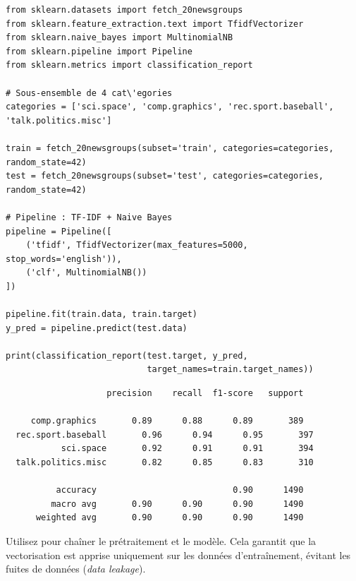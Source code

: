 \begin{codeblock}[title=\textbf{Python}]
\begin{verbatim}
from sklearn.datasets import fetch_20newsgroups
from sklearn.feature_extraction.text import TfidfVectorizer
from sklearn.naive_bayes import MultinomialNB
from sklearn.pipeline import Pipeline
from sklearn.metrics import classification_report

# Sous-ensemble de 4 cat\'egories
categories = ['sci.space', 'comp.graphics', 'rec.sport.baseball', 'talk.politics.misc']

train = fetch_20newsgroups(subset='train', categories=categories, random_state=42)
test = fetch_20newsgroups(subset='test', categories=categories, random_state=42)

# Pipeline : TF-IDF + Naive Bayes
pipeline = Pipeline([
    ('tfidf', TfidfVectorizer(max_features=5000, stop_words='english')),
    ('clf', MultinomialNB())
])

pipeline.fit(train.data, train.target)
y_pred = pipeline.predict(test.data)

print(classification_report(test.target, y_pred,
                            target_names=train.target_names))
\end{verbatim}
\end{codeblock}

\begin{codeoutput}
\begin{verbatim}
                    precision    recall  f1-score   support

     comp.graphics       0.89      0.88      0.89       389
  rec.sport.baseball       0.96      0.94      0.95       397
           sci.space       0.92      0.91      0.91       394
  talk.politics.misc       0.82      0.85      0.83       310

          accuracy                           0.90      1490
         macro avg       0.90      0.90      0.90      1490
      weighted avg       0.90      0.90      0.90      1490
\end{verbatim}
\end{codeoutput}

\begin{bonnepratique}
Utilisez  pour cha\^iner le pr\'etraitement et le mod\`ele. Cela garantit que la vectorisation est apprise uniquement sur les donn\'ees d'entra\^inement, \'evitant les fuites de donn\'ees (\textit{data leakage}).
\end{bonnepratique}

